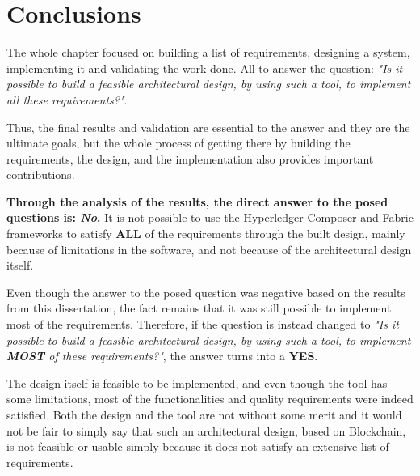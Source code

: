 \section{Conclusions}

The whole chapter focused on building a list of requirements, designing a system, implementing it and validating the work done. All to answer the question: \textit{"Is it possible to build a feasible architectural design, by using such a tool, to implement all these requirements?"}.

Thus, the final results and validation are essential to the answer and they are the ultimate goals, but the whole process of getting there by building the requirements, the design, and the implementation also provides important contributions.


\textbf{Through the analysis of the results, the direct answer to the posed questions is: \textit{No}.} It is not possible to use the Hyperledger Composer and Fabric frameworks to satisfy \textbf{ALL} of the requirements through the built design, mainly because of limitations in the software, and not because of the architectural design itself.

Even though the answer to the posed question was negative based on the results from this dissertation, the fact remains that it was still possible to implement most of the requirements. Therefore, if the question is instead changed to \textit{"Is it possible to build a feasible architectural design, by using such a tool, to implement \textbf{MOST} of these requirements?"}, the answer turns into a \textbf{YES}. 

The design itself is feasible to be implemented, and even though the tool has some limitations, most of the functionalities and quality requirements were indeed satisfied. Both the design and the tool are not without some merit and it would not be fair to simply say that such an architectural design, based on Blockchain, is not feasible or usable simply because it does not satisfy an extensive list of requirements.



